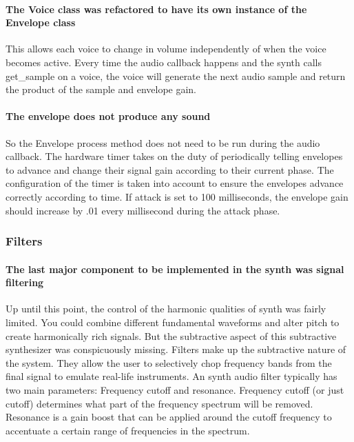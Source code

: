\documentclass[acmlarge,screen]{acmart}
\begin{document}
	\paragraph{The Voice class was refactored to have its own instance of the Envelope class} This allows each voice to change in volume independently of when the voice becomes active. Every time the audio callback happens and the synth calls get\_sample on a voice, the voice will generate the next audio sample and return the product of the sample and envelope gain.
	
	\paragraph{The envelope does not produce any sound} So the Envelope process method does not need to be run during the audio callback. The hardware timer takes on the duty of periodically telling envelopes to advance and change their signal gain according to their current phase. The configuration of the timer is taken into account to ensure the envelopes advance correctly according to time. If attack is set to 100 milliseconds, the envelope gain should increase by .01 every millisecond during the attack phase.
	
	\subsubsection{Filters}
	\paragraph{The last major component to be implemented in the synth was signal filtering} Up until this point, the control of the harmonic qualities of synth was fairly limited. You could combine different fundamental waveforms and alter pitch to create harmonically rich signals. But the subtractive aspect of this subtractive synthesizer was conspicuously missing. Filters make up the subtractive nature of the system. They allow the user to selectively chop frequency bands from the final signal to emulate real-life instruments.\cite{welsh_2006} An synth audio filter typically has two main parameters: Frequency cutoff and resonance. Frequency cutoff (or just cutoff) determines what part of the frequency spectrum will be removed. Resonance is a gain boost that can be applied around the cutoff frequency to accentuate a certain range of frequencies in the spectrum. \cite{musictech}
\end{document}

